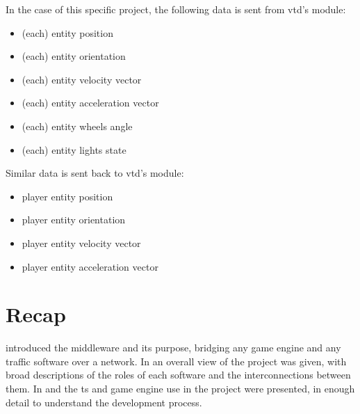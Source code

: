 

In the case of this specific project, the following data is sent from \gls{vtd}'s  module:

\begin{itemize}
	\item (each) entity position
	\item (each) entity orientation
	\item (each) entity velocity vector
	\item (each) entity acceleration vector
	\item (each) entity wheels angle
	\item (each) entity lights state
\end{itemize}

\FLOATnoindent Similar data is sent back to \gls{vtd}'s  module:

\begin{itemize}
	\item player entity position
	\item player entity orientation
	\item player entity velocity vector
	\item player entity acceleration vector
\end{itemize}

\section{Recap}\label{sc:software:recap}

 introduced the \gls{middleware} and its purpose, bridging any game engine and any traffic software over a network. In  an overall view of the project was given, with broad descriptions of the roles of each software and the interconnections between them. In  and  the \gls{ts} and game engine use in the project were presented, in enough detail to understand the development process.
